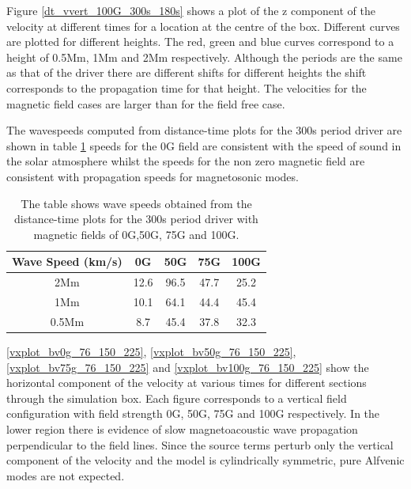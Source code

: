 \documentclass{aastex62}
\begin{document}

Figure \ref{dt_vvert_100G_300s_180s} shows a plot of the z component of the velocity at different times for a location at the centre of the box. Different curves are plotted for different heights. The red, green and blue curves correspond to a height  of 0.5Mm, 1Mm and 2Mm respectively. Although the periods are the same as that of the driver there are different shifts for different heights the shift corresponds to the propagation time for that height. The velocities for the magnetic field cases are larger than for the field free case.


The wavespeeds computed from distance-time plots for the 300s period driver are shown in table \ref{Tablewavespeeds_300s} speeds for the 0G field are consistent with the speed of sound in the solar atmosphere whilst the speeds for the non zero magnetic field are consistent with propagation speeds for magnetosonic modes. 
\begin{table}\label{wavespeeds}
\centering
\begin{tabular}{c c c c c}
\hline
Wave Speed (km/s)   &  0G  &  50G &  75G & 100G\\
\hline
2Mm & 12.6  &   96.5       &   47.7      &  25.2     \\
\hline
1Mm & 10.1  &    64.1      &   44.4     &   45.4      \\
\hline
0.5Mm & 8.7  &   45.4      &   37.8      &   32.3    \\
\hline

\end{tabular} 
\caption{The table shows wave speeds obtained from the distance-time plots for the 300s period driver with magnetic fields of 0G,50G, 75G and 100G.}
\label{Tablewavespeeds_300s}
\end{table}

\ref{vxplot_bv0g_76_150_225}, \ref{vxplot_bv50g_76_150_225}, \ref{vxplot_bv75g_76_150_225} and \ref{vxplot_bv100g_76_150_225} show the horizontal component of the velocity at various times for different sections through the simulation box. Each figure corresponds to a vertical field configuration with field strength 0G, 50G, 75G and 100G respectively. In the lower region there is evidence of slow magnetoacoustic wave propagation perpendicular to the field lines. Since the source terms perturb only the vertical component of the velocity and the model is cylindrically symmetric, pure Alfvenic modes are not expected. 
\end{document}
